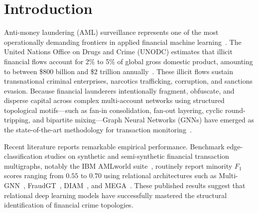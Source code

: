 \documentclass[pdflatex,sn-mathphys,Numbered]{sn-jnl}
\theoremstyle{thmstyleone}
\theoremstyle{thmstyletwo}
\theoremstyle{thmstylethree}
\begin{document}

\maketitle

\section{Introduction}
\label{sec:introduction}

Anti-money laundering (AML) surveillance represents one of the most operationally demanding frontiers in applied financial machine learning~\cite{weber2019elliptic,altman2023ibmaml,chainalysis2026crime}. The United Nations Office on Drugs and Crime (UNODC) estimates that illicit financial flows account for 2\% to 5\% of global gross domestic product, amounting to between \$800 billion and \$2 trillion annually~\cite{chainalysis2026crime}. These illicit flows sustain transnational criminal enterprises, narcotics trafficking, corruption, and sanctions evasion. Because financial launderers intentionally fragment, obfuscate, and disperse capital across complex multi-account networks using structured topological motifs---such as fan-in consolidation, fan-out layering, cyclic round-tripping, and bipartite mixing---Graph Neural Networks (GNNs) have emerged as the state-of-the-art methodology for transaction monitoring~\cite{egressy2024multigraph,lin2024fraudgt,bilgi2026mega,ding2024diam}.

Recent literature reports remarkable empirical performance. Benchmark edge-classification studies on synthetic and semi-synthetic financial transaction multigraphs, notably the IBM AMLworld suite~\cite{altman2023ibmaml}, routinely report minority $F_1$ scores ranging from $0.55$ to $0.70$ using relational architectures such as Multi-GNN~\cite{egressy2024multigraph}, FraudGT~\cite{lin2024fraudgt}, DIAM~\cite{ding2024diam}, and MEGA~\cite{bilgi2026mega}. These published results suggest that relational deep learning models have successfully mastered the structural identification of financial crime topologies.
\end{document}
